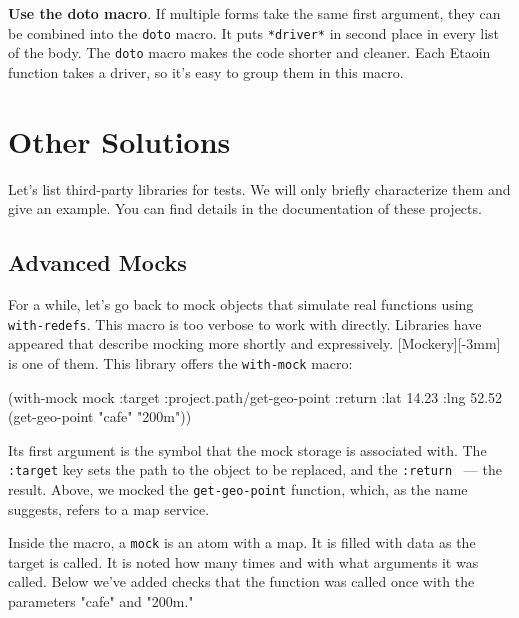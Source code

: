 
\textbf{Use the doto macro}. If multiple forms take the same first argument, they can be combined into the \verb|doto| macro. It puts \verb|*driver*| in second place in every list of the body. The \verb|doto| macro makes the code shorter and cleaner. Each Etaoin function takes a driver, so it's easy to group them in this macro.

\section{Other Solutions}

Let's list third-party libraries for tests. We will only briefly characterize them and give an example. You can find details in the documentation of these projects.

\subsection{Advanced Mocks}


For a while, let's go back to mock objects that simulate real functions using \verb|with-redefs|. This macro is too verbose to work with directly. Libraries have appeared that describe mocking more shortly and expressively.
[Mockery][-3mm] is one of them. This library offers the \verb|with-mock| macro:

\begin{english}
  \begin{clojure}
(with-mock mock
  {:target :project.path/get-geo-point
   :return {:lat 14.23 :lng 52.52}}
  (get-geo-point "cafe" "200m"))
  \end{clojure}
\end{english}

Its first argument is the symbol that the mock storage is associated with. The \verb|:target| key sets the path to the object to be replaced, and the \verb|:return| ~--- the result. Above, we mocked the \verb|get-geo-point| function, which, as the name suggests, refers to a map service.

Inside the macro, a \verb|mock| is an atom with a map. It is filled with data as the target is called.  It is noted how many times and with what arguments it was called. Below we've added checks that the function was called once with the parameters "cafe" and "200m."

